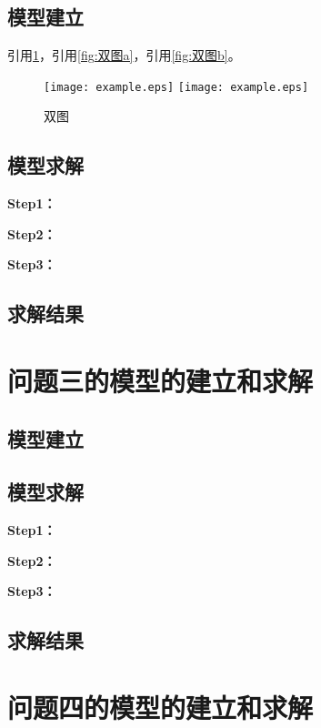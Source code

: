 \documentclass[withoutpreface,bwprint]{cumcmthesis}
\begin{document}
\subsection{模型建立}

引用\cref{fig:双图}，引用\cref{fig:双图a}，引用\cref{fig:双图b}。

\begin{figure}[ht]
\centering
{}
{\texttt{[image: example.eps]}}
{\texttt{[image: example.eps]}}
\caption{双图}\label{fig:双图}
\end{figure} 

\subsection{模型求解}

\textbf{Step1：} 

\textbf{Step2：} 

\textbf{Step3：} 

\subsection{求解结果}


\section{问题三的模型的建立和求解}
\subsection{模型建立}

\subsection{模型求解}

\textbf{Step1：} 

\textbf{Step2：} 

\textbf{Step3：} 

\subsection{求解结果}


\section{问题四的模型的建立和求解}
\end{document}
